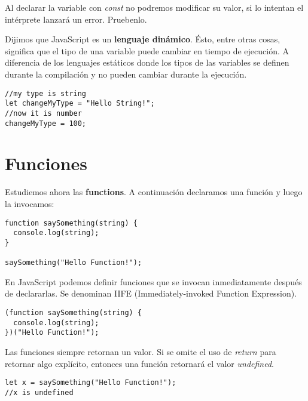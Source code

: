 \documentclass[a4paper, oneside, titlepage, 12pt]{paper}
\begin{document}
Al declarar la variable con \textit{const} no podremos modificar su valor, si lo intentan el intérprete lanzará un error. Pruebenlo.  
\newline

Dijimos que JavaScript es un \textbf{lenguaje dinámico}. Ésto, entre otras cosas, significa que el tipo de una variable puede cambiar en tiempo de ejecución. A diferencia de los lenguajes estáticos donde los tipos de las variables se definen durante la compilación y no pueden cambiar durante la ejecución.

\begin{verbatim}
//my type is string
let changeMyType = "Hello String!";
//now it is number
changeMyType = 100;
\end{verbatim}

\section{Funciones} \label{functions}

Estudiemos ahora las \textbf{functions}. A continuación declaramos una función y luego la invocamos:

\begin{verbatim}
function saySomething(string) {
  console.log(string);
}

saySomething("Hello Function!");
\end{verbatim}

En JavaScript podemos definir funciones que se invocan inmediatamente después de declararlas. Se denominan IIFE (Immediately-invoked Function Expression).

\begin{verbatim}
(function saySomething(string) {
  console.log(string);
})("Hello Function!");
\end{verbatim}

Las funciones siempre retornan un valor. Si se omite el uso de \textit{return} para retornar algo explícito, entonces una función retornará el valor \textit{undefined}.

\begin{verbatim}
let x = saySomething("Hello Function!");
//x is undefined
\end{verbatim}
\end{document}
